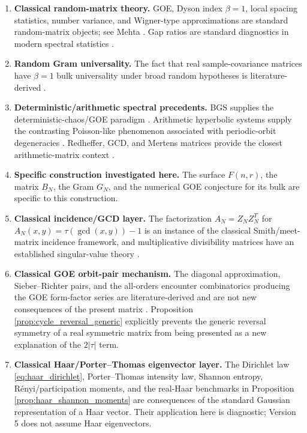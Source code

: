 \documentclass[11pt]{amsart}
\numberwithin{equation}{section}
\theoremstyle{plain}
\theoremstyle{definition}
\theoremstyle{remark}
\begin{document}
\begin{enumerate}[label=(\roman*)]
\item \textbf{Classical random-matrix theory.}  GOE, Dyson index $\beta=1$, local spacing statistics, number variance, and Wigner-type approximations are standard random-matrix objects; see Mehta \cite{Mehta2004}.  Gap ratios are standard diagnostics in modern spectral statistics \cite{OganesyanHuse2007,Atas2013}.

\item \textbf{Random Gram universality.}  The fact that real sample-covariance matrices have $\beta=1$ bulk universality under broad random hypotheses is literature-derived \cite{TaoVu2012,PillaiYin2014}.

\item \textbf{Deterministic/arithmetic spectral precedents.}  BGS supplies the deterministic-chaos/GOE paradigm \cite{BGS1984}.  Arithmetic hyperbolic systems supply the contrasting Poisson-like phenomenon associated with periodic-orbit degeneracies \cite{BogomolnyEtAl1992,LuoSarnak1994}.  Redheffer, GCD, and Mertens matrices provide the closest arithmetic-matrix context \cite{BarrettJarvis1992,HongLoewy2004,Cardinal2010,ClementSteinerberger2025,Kline2019,Kline2020}.

\item \textbf{Specific construction investigated here.}  The surface $F(n,r)$, the matrix $B_N$, the Gram $G_N$, and the numerical GOE conjecture for its bulk are specific to this construction.

\item \textbf{Classical incidence/GCD layer.}
The factorization $A_N=Z_NZ_N^T$ for $A_N(x,y)=\tau(\gcd(x,y))-1$ is an instance of the classical Smith/meet-matrix incidence framework, and multiplicative divisibility matrices have an established singular-value theory \cite{HaukkanenWangSillanpaa1997,KorkeeHaukkanen2003,Hilberdink2017}.
\item \textbf{Classical GOE orbit-pair mechanism.}
The diagonal approximation, Sieber--Richter pairs, and the all-orders encounter combinatorics producing the GOE form-factor series are literature-derived and are not new consequences of the present matrix \cite{Berry1985,SieberRichter2001,MullerEtAl2004,MullerEtAl2005}.  Proposition \ref{prop:cycle_reversal_generic} explicitly prevents the generic reversal symmetry of a real symmetric matrix from being presented as a new explanation of the $2|\tau|$ term.

\item \textbf{Classical Haar/Porter--Thomas eigenvector layer.}
The Dirichlet law \eqref{eq:haar_dirichlet}, Porter--Thomas intensity law, Shannon entropy, R\'enyi/participation moments, and the real-Haar benchmarks in Proposition \ref{prop:haar_shannon_moments} are consequences of the standard Gaussian representation of a Haar vector.  Their application here is diagnostic; Version 5 does not assume Haar eigenvectors.


\end{enumerate}
\end{document}

